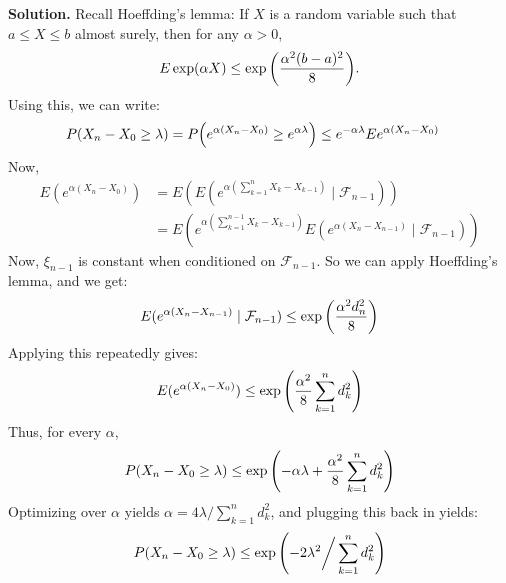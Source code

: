 \documentclass[12pt]{article}
\theoremstyle{definitionstyle}
\newcommand{\1}{\mathds 1}
\begin{document}
    \textbf{Solution.}
    Recall Hoeffding's lemma: If $X$ is a random variable such that $a \leq X \leq b$ almost surely, then for any $\alpha > 0$,
    \begin{align*}
        E\exp(\alpha X) \leq \exp\qty(\frac{\alpha^2(b-a)^2}{8}).
    \end{align*}
    Using this, we can write:
    \begin{align*}
        P(X_n - X_0 \geq \lambda) &= P\qty(e^{\alpha(X_n - X_0)} \geq e^{\alpha \lambda}) \leq e^{-\alpha \lambda} E e^{\alpha(X_n - X_0)}
    \end{align*}
    Now,
    \begin{align*}
        E(e^{\alpha(X_n - X_0)}) &= E(E(e^{\alpha(\sum_{k=1}^n X_k - X_{k-1})} \mid \mathcal F_{n-1})) \\
        &= E(e^{\alpha(\sum_{k=1}^{n-1} X_k - X_{k-1})} E(e^{\alpha(X_n - X_{n-1})} \mid \mathcal F_{n-1}))
    \end{align*}
    Now, $\xi_{n-1}$ is constant when conditioned on $\mathcal F_{n-1}$. So we can apply Hoeffding's lemma, and we get:
    \begin{align*}
        E(e^{\alpha(X_n - X_{n-1})} \mid \mathcal F_{n-1}) \leq \exp\qty(\frac{\alpha^2d_{n}^2}{8})
    \end{align*}
    Applying this repeatedly gives:
    \begin{align*}
        E(e^{\alpha(X_n - X_0)}) \leq \exp\qty(\frac{\alpha^2}{8}\sum_{k=1}^n d_k^2)
    \end{align*}
    Thus, for every $\alpha$,
    \begin{align*}
        P(X_n - X_0 \geq \lambda) \leq \exp\qty(-\alpha \lambda + \frac{\alpha^2}{8}\sum_{k=1}^n d_k^2)
    \end{align*}
    Optimizing over $\alpha$ yields $\alpha = 4\lambda\big/\sum_{k=1}^n d_k^2$, and plugging this back in yields:
    \begin{align*}
        P(X_n - X_0 \geq \lambda) \leq \exp\qty(-2\lambda^2\bigg/\sum_{k=1}^n d_k^2)
    \end{align*}
\end{document}
